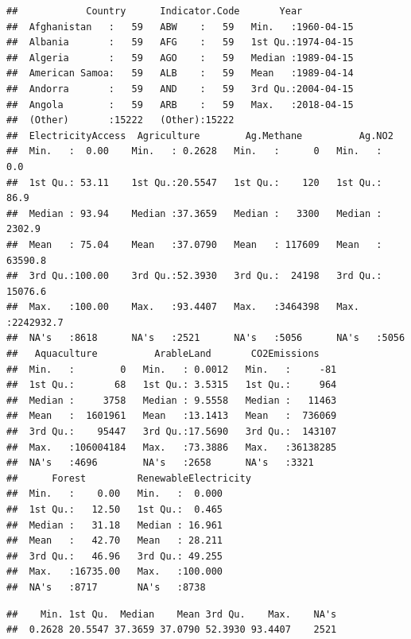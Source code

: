 \documentclass[12pt,]{article}
\newenvironment{Shaded}{\begin{snugshade}}{\end{snugshade}}
\newcommand{\KeywordTok}[1]{\textcolor[rgb]{0.13,0.29,0.53}{\textbf{#1}}}
\newcommand{\OperatorTok}[1]{\textcolor[rgb]{0.81,0.36,0.00}{\textbf{#1}}}
\newcommand{\NormalTok}[1]{#1}
\begin{document}
\begin{verbatim}
##            Country      Indicator.Code       Year           
##  Afghanistan   :   59   ABW    :   59   Min.   :1960-04-15  
##  Albania       :   59   AFG    :   59   1st Qu.:1974-04-15  
##  Algeria       :   59   AGO    :   59   Median :1989-04-15  
##  American Samoa:   59   ALB    :   59   Mean   :1989-04-14  
##  Andorra       :   59   AND    :   59   3rd Qu.:2004-04-15  
##  Angola        :   59   ARB    :   59   Max.   :2018-04-15  
##  (Other)       :15222   (Other):15222                       
##  ElectricityAccess  Agriculture        Ag.Methane          Ag.NO2         
##  Min.   :  0.00    Min.   : 0.2628   Min.   :      0   Min.   :      0.0  
##  1st Qu.: 53.11    1st Qu.:20.5547   1st Qu.:    120   1st Qu.:     86.9  
##  Median : 93.94    Median :37.3659   Median :   3300   Median :   2302.9  
##  Mean   : 75.04    Mean   :37.0790   Mean   : 117609   Mean   :  63590.8  
##  3rd Qu.:100.00    3rd Qu.:52.3930   3rd Qu.:  24198   3rd Qu.:  15076.6  
##  Max.   :100.00    Max.   :93.4407   Max.   :3464398   Max.   :2242932.7  
##  NA's   :8618      NA's   :2521      NA's   :5056      NA's   :5056       
##   Aquaculture          ArableLand       CO2Emissions     
##  Min.   :        0   Min.   : 0.0012   Min.   :     -81  
##  1st Qu.:       68   1st Qu.: 3.5315   1st Qu.:     964  
##  Median :     3758   Median : 9.5558   Median :   11463  
##  Mean   :  1601961   Mean   :13.1413   Mean   :  736069  
##  3rd Qu.:    95447   3rd Qu.:17.5690   3rd Qu.:  143107  
##  Max.   :106004184   Max.   :73.3886   Max.   :36138285  
##  NA's   :4696        NA's   :2658      NA's   :3321      
##      Forest         RenewableElectricity
##  Min.   :    0.00   Min.   :  0.000     
##  1st Qu.:   12.50   1st Qu.:  0.465     
##  Median :   31.18   Median : 16.961     
##  Mean   :   42.70   Mean   : 28.211     
##  3rd Qu.:   46.96   3rd Qu.: 49.255     
##  Max.   :16735.00   Max.   :100.000     
##  NA's   :8717       NA's   :8738
\end{verbatim}

\begin{Shaded}
\end{Shaded}

\begin{verbatim}
##    Min. 1st Qu.  Median    Mean 3rd Qu.    Max.    NA's 
##  0.2628 20.5547 37.3659 37.0790 52.3930 93.4407    2521
\end{verbatim}
\end{document}
